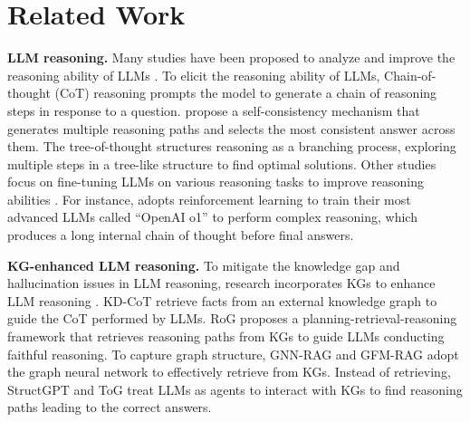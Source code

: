 \section{Related Work}
\noindent\textbf{LLM reasoning.} Many studies have been proposed to analyze and improve the reasoning ability of LLMs \citep{wei2022chain,wangself,yao2024tree}. To elicit the reasoning ability of LLMs, Chain-of-thought (CoT) reasoning \citep{wei2022chain} prompts the model to generate a chain of reasoning steps in response to a question. \citet{wangself} propose a self-consistency mechanism that generates multiple reasoning paths and selects the most consistent answer across them. The tree-of-thought \citep{yao2024tree} structures reasoning as a branching process, exploring multiple steps in a tree-like structure to find optimal solutions. Other studies focus on fine-tuning LLMs on various reasoning tasks to improve reasoning abilities \citep{yu2022alert,hoffman2024training}. For instance, \citet{openai_o1} adopts reinforcement learning to train their most advanced LLMs called ``OpenAI o1'' to perform complex reasoning, which produces a long internal chain of thought before final answers.

\noindent\textbf{KG-enhanced LLM reasoning.}
To mitigate the knowledge gap and hallucination issues in LLM reasoning, research incorporates KGs to enhance LLM reasoning \citep{pan2023unifying}. KD-CoT \citep{wang2023knowledge} retrieve facts from an external knowledge graph to guide the CoT performed by LLMs. RoG \citep{luo2024rog} proposes a planning-retrieval-reasoning framework that retrieves reasoning paths from KGs to guide LLMs conducting faithful reasoning. To capture graph structure, GNN-RAG \citep{mavromatis2024gnn} and GFM-RAG \citep{luo2025gfmrag} adopt the graph neural network to effectively retrieve from KGs. Instead of retrieving, StructGPT \citep{jiang2023structgpt} and ToG \citep{sunthink} treat LLMs as agents to interact with KGs to find reasoning paths leading to the correct answers.




